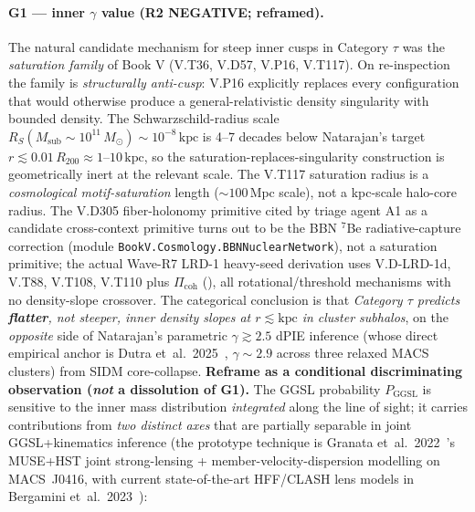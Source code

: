 \documentclass{pantarhei-researchnote}
\newcommand{\Msub}{M_{\mathrm{sub}}}
\newcommand{\Rtwohun}{R_{200}}
\newcommand{\Mpc}{\mathrm{Mpc}}
\newcommand{\kpc}{\mathrm{kpc}}
\newcommand{\Msun}{M_{\odot}}
\newcommand{\Rs}{R_S}                           %
\newcommand{\Pggsl}{P_{\mathrm{GGSL}}}
\begin{document}
\paragraph{G1 — inner $\gamma$ value (R2 NEGATIVE; reframed).}
The natural candidate mechanism for steep inner cusps in
Category $\tau$ was the \emph{saturation family} of Book V
(V.T36, V.D57, V.P16, V.T117). On re-inspection the family is
\emph{structurally anti-cusp}: V.P16 explicitly replaces every
configuration that would otherwise produce a general-relativistic
density singularity with bounded density. The Schwarzschild-radius
scale $\Rs(\Msub \sim 10^{11}\,\Msun) \sim 10^{-8}\,\kpc$ is 4--7
decades below Natarajan's target $r \lesssim 0.01\,\Rtwohun \approx
1$--$10\,\kpc$, so the saturation-replaces-singularity construction is
geometrically inert at the relevant scale. The V.T117 saturation
radius is a \emph{cosmological motif-saturation} length
($\sim 100\,\Mpc$ scale), not a kpc-scale halo-core radius.
The V.D305 fiber-holonomy primitive cited by triage agent A1 as a
candidate cross-context primitive turns out to be the BBN $^7$Be
radiative-capture correction (module
\texttt{BookV.Cosmology.BBNNuclearNetwork}), not a saturation
primitive; the actual Wave-R7 LRD-1 heavy-seed derivation uses
V.D-LRD-1d, V.T88, V.T108, V.T110 plus $\Pi_{\mathrm{coh}}$
(\cite{LRDCategoricalv33}), all rotational/threshold mechanisms with
no density-slope crossover.
\smallskip\noindent
The categorical conclusion is that
\emph{Category $\tau$ predicts \textbf{flatter}, not steeper, inner
density slopes at $r \lesssim \kpc$ in cluster subhalos}, on the
\emph{opposite} side of Natarajan's parametric $\gamma \gtrsim 2.5$
dPIE inference (whose direct empirical anchor is Dutra et~al.\
2025~\cite{Dutra2025}, $\gamma \sim 2.9$ across three relaxed MACS clusters)
from SIDM core-collapse.
\smallskip\noindent
\textbf{Reframe as a conditional discriminating observation
(\emph{not} a dissolution of G1).} The GGSL probability $\Pggsl$ is
sensitive to the inner mass distribution \emph{integrated} along the
line of sight; it carries contributions from \emph{two distinct axes}
that are partially separable in joint GGSL+kinematics inference (the
prototype technique is Granata et~al.\ 2022~\cite{Granata2022}'s MUSE+HST
joint strong-lensing + member-velocity-dispersion modelling on
MACS~J0416, with current state-of-the-art HFF/CLASH lens models in
Bergamini et~al.\ 2023~\cite{Bergamini2023}):
\end{document}
